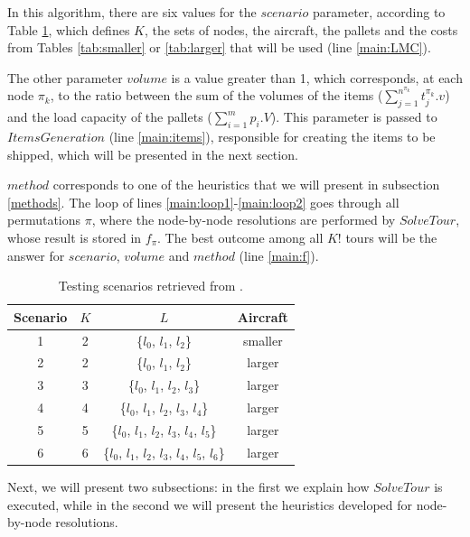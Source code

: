 \documentclass[preprint,authoryear]{elsarticle}
\begin{document}
In this algorithm, there are six values for the $scenario$\/ parameter, according to Table \ref{tab:scenarios}, which defines $K$, the sets of nodes, the aircraft, the pallets and the costs from Tables \ref{tab:smaller} or \ref{tab:larger} that will be used (line \ref{main:LMC}).


The other parameter $volume$\/ is a value greater than 1, which corresponds, at each node $\pi_k$, to the ratio between the sum of the volumes of the items ($\sum_{j=1}^{n^{\pi_k}} t^{\pi_k}_j.v$) and the load capacity of the pallets ($\sum_{i=1}^{m} p_i.V$). This parameter is passed to $ItemsGeneration$ (line \ref{main:items}), responsible for creating the items to be shipped, which will be presented in the next section.

$method$\/ corresponds to one of the heuristics that we will present in subsection \ref{methods}. The loop of lines \ref{main:loop1}-\ref{main:loop2} goes through all permutations $\pi$, where the node-by-node resolutions are performed by $SolveTour$, whose result is stored in $f_{\pi}$. The best outcome among all $K!$\/ tours will be the answer for $scenario$, $volume$\/ and $method$\/ (line \ref{main:f}). 

\vspace{2.0mm}
\begin{table}[H]
	\centering
	\caption{Testing scenarios retrieved from \cite{MesquitaSanches2023}.}  \label{tab:scenarios}
	\begin{tabular}{c c c c }
		\toprule
		{\bf Scenario} & {$K$} & {$L$} & {\bf Aircraft} \\		
		\midrule
		1 & 2    & \{$l_0$, $l_1$, $l_2$\}                                 & smaller \\
		2 & 2    & \{$l_0$, $l_1$, $l_2$\}                                 & larger  \\
		3 & 3    & \{$l_0$, $l_1$, $l_2$, $l_3$\}                          & larger  \\
		4 & 4    & \{$l_0$, $l_1$, $l_2$, $l_3$, $l_4$\}                   & larger  \\
		5 & 5    & \{$l_0$, $l_1$, $l_2$, $l_3$, $l_4$, $l_5$\}            & larger  \\
		6 & 6    & \{$l_0$, $l_1$, $l_2$, $l_3$, $l_4$, $l_5$, $l_6$\}     & larger  \\
		\bottomrule
	\end{tabular}
\end{table}

Next, we will present two subsections: in the first we explain how $SolveTour$ is executed, while in the second we will present the heuristics developed for node-by-node resolutions.
\end{document}
